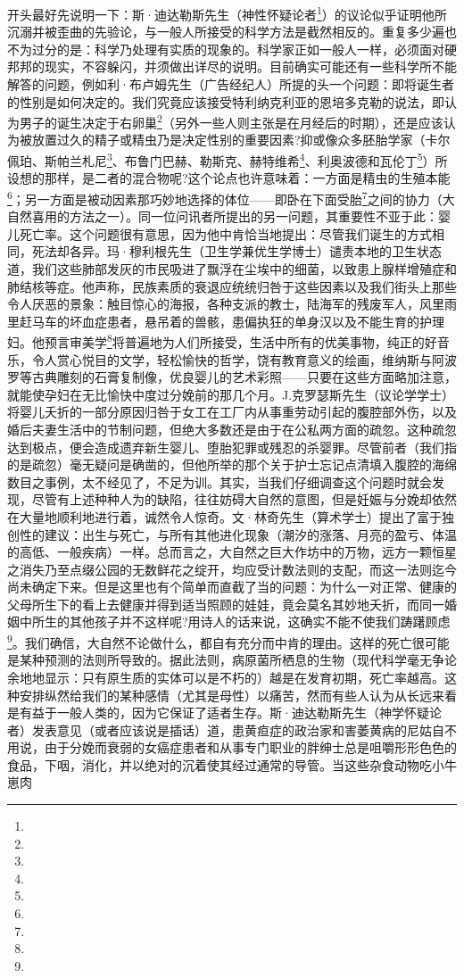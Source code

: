 \par 开头最好先说明一下：斯·迪达勒斯先生（神性怀疑论者\footnote{}）的议论似乎证明他所沉溺并被歪曲的先验论，与一般人所接受的科学方法是截然相反的。重复多少遍也不为过分的是：科学乃处理有实质的现象的。科学家正如一般人一样，必须面对硬邦邦的现实，不容躲闪，并须做出详尽的说明。目前确实可能还有一些科学所不能解答的问题，例如利·布卢姆先生（广告经纪人）所提的头一个问题：即将诞生者的性别是如何决定的。我们究竟应该接受特利纳克利亚的恩培多克勒的说法，即认为男子的诞生决定于右卵巢\footnote{}（另外一些人则主张是在月经后的时期），还是应该认为被放置过久的精子或精虫乃是决定性别的重要因素?抑或像众多胚胎学家（卡尔佩珀、斯帕兰札尼\footnote{}、布鲁门巴赫、勒斯克、赫特维希\footnote{}、利奥波德和瓦伦丁\footnote{}）所设想的那样，是二者的混合物呢?这个论点也许意味着：一方面是精虫的生殖本能\footnote{}；另一方面是被动因素那巧妙地选择的体位——即卧在下面受胎\footnote{}之间的协力（大自然喜用的方法之一）。同一位问讯者所提出的另一问题，其重要性不亚于此：婴儿死亡率。这个问题很有意思，因为他中肯恰当地提出：尽管我们诞生的方式相同，死法却各异。玛·穆利根先生（卫生学兼优生学博士）谴责本地的卫生状态道，我们这些肺部发灰的市民吸进了飘浮在尘埃中的细菌，以致患上腺样增殖症和肺结核等症。他声称，民族素质的衰退应统统归咎于这些因素以及我们街头上那些令人厌恶的景象：触目惊心的海报，各种支派的教士，陆海军的残废军人，风里雨里赶马车的坏血症患者，悬吊着的兽骸，患偏执狂的单身汉以及不能生育的护理妇。他预言审美学\footnote{}将普遍地为人们所接受，生活中所有的优美事物，纯正的好音乐，令人赏心悦目的文学，轻松愉快的哲学，饶有教育意义的绘画，维纳斯与阿波罗等古典雕刻的石膏复制像，优良婴儿的艺术彩照——只要在这些方面略加注意，就能使孕妇在无比愉快中度过分娩前的那几个月。J.克罗瑟斯先生（议论学学士）将婴儿夭折的一部分原因归咎于女工在工厂内从事重劳动引起的腹腔部外伤，以及婚后夫妻生活中的节制问题，但绝大多数还是由于在公私两方面的疏忽。这种疏忽达到极点，便会造成遗弃新生婴儿、堕胎犯罪或残忍的杀婴罪。尽管前者（我们指的是疏忽）毫无疑问是确凿的，但他所举的那个关于护士忘记点清填入腹腔的海绵数目之事例，太不经见了，不足为训。其实，当我们仔细调查这个问题时就会发现，尽管有上述种种人为的缺陷，往往妨碍大自然的意图，但是妊娠与分娩却依然在大量地顺利地进行着，诚然令人惊奇。文·林奇先生（算术学士）提出了富于独创性的建议：出生与死亡，与所有其他进化现象（潮汐的涨落、月亮的盈亏、体温的高低、一般疾病）一样。总而言之，大自然之巨大作坊中的万物，远方一颗恒星之消失乃至点缀公园的无数鲜花之绽开，均应受计数法则的支配，而这一法则迄今尚未确定下来。但是这里也有个简单而直截了当的问题：为什么一对正常、健康的父母所生下的看上去健康并得到适当照顾的娃娃，竟会莫名其妙地夭折，而同一婚姻中所生的其他孩子并不这样呢?用诗人的话来说，这确实不能不使我们踌躇顾虑\footnote{}。我们确信，大自然不论做什么，都自有充分而中肯的理由。这样的死亡很可能是某种预测的法则所导致的。据此法则，病原菌所栖息的生物（现代科学毫无争论余地地显示：只有原生质的实体可以是不朽的）越是在发育初期，死亡率越高。这种安排纵然给我们的某种感情（尤其是母性）以痛苦，然而有些人认为从长远来看是有益于一般人类的，因为它保证了适者生存。斯·迪达勒斯先生（神学怀疑论者）发表意见（或者应该说是插话）道，患黄疸症的政治家和害萎黄病的尼姑自不用说，由于分娩而衰弱的女癌症患者和从事专门职业的胖绅士总是咀嚼形形色色的食品，下咽，消化，并以绝对的沉着使其经过通常的导管。当这些杂食动物吃小牛崽肉